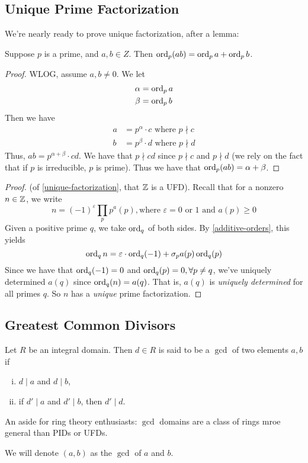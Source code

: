 \subsection{Unique Prime Factorization}
We're nearly ready to prove unique factorization, after a lemma:
\begin{lemma}\label{additive-orders}
    Suppose $p$ is a prime, and $a, b\in Z$. Then $\operatorname{ord}_p(ab) = \operatorname{ord}_p a + \operatorname{ord}_p b$.
\end{lemma}
\begin{proof}
    WLOG, assume $a, b\neq 0$. We let
    \begin{align*}
        \alpha & = \operatorname{ord}_p a \\
        \beta  & = \operatorname{ord}_p b
    \end{align*}
    Then we have
    \begin{align*}
        a & = p^\alpha\cdot c \text{ where }p\nmid c \\
        b & = p^\beta\cdot d \text{ where }p\nmid d
    \end{align*}
    Thus, $ab = p^{\alpha + \beta}\cdot cd$. We have that $p\nmid cd$ since $p\nmid c$ and $p\nmid d$ (we rely on the fact that if $p$ is irreducible, $p$ is prime). Thus we have that $\operatorname{ord}_p (ab) = \alpha + \beta$.
\end{proof}

\begin{proof}
    (of \cref{unique-factorization}, that $\mathbb Z$ is a UFD). Recall that for a nonzero $n\in \mathbb Z$, we write
    \[n = (-1)^\varepsilon \prod_{p}p^a(p), \text{where }\varepsilon = 0\text{ or }1\text{ and }a(p)\geq 0\]
    Given a positive prime $q$, we take $\operatorname{ord}_q$ of both sides. By \cref{additive-orders}, this yields
    \[\operatorname{ord}_q n = \varepsilon\cdot \operatorname{ord}_q (-1) + \sigma_p a(p)\operatorname{ord}_q(p)\]
    Since we have that $\operatorname{ord}_q(-1) = 0$ and $\operatorname{ord}_q(p) = 0, \forall p\neq q$, we've uniquely determined $a(q)$ since $\operatorname{ord}_q(n) = a(q)$. That is, $a(q)$ is \emph{uniquely determined} for all primes $q$. So $n$ has a \emph{unique} prime factorization.
\end{proof}

\subsection{Greatest Common Divisors}
\begin{definition}
    Let $R$ be an integral domain. Then $d\in R$ is said to be a $\gcd$ of two elements $a, b$ if
    \begin{enumerate}[i)]
        \item $d\mid a$ and $d\mid b$,
        \item if $d'\mid a$ and $d'\mid b$, then $d'\mid d$.
    \end{enumerate}
\end{definition}
\begin{remark*}
    An aside for ring theory enthusiasts: $\gcd$ domains are a class of rings mroe general than PIDs or UFDs.
\end{remark*}
We will denote $(a, b)$ as the $\gcd$ of $a$ and $b$.

